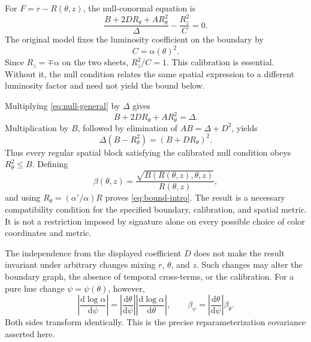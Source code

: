\documentclass[9pt,twocolumn,twoside]{opticajnl}
\theoremstyle{plain}
\newcommand{\dd}{\mathrm{d}}
\begin{document}
For $F=r-R(\theta,z)$, the null-conormal equation is
\begin{equation}
 \frac{B+2DR_\theta+AR_\theta^2}{\Delta}-\frac{R_z^2}{C}=0.
 \label{eq:null-general}
\end{equation}
The original model fixes the luminosity coefficient on the boundary by
\begin{equation}
 C=\alpha(\theta)^2.
 \label{eq:calibration}
\end{equation}
Since $R_z=\mp\alpha$ on the two sheets, $R_z^2/C=1$. This calibration is essential. Without it, the null condition relates the same spatial expression to a different luminosity factor and need not yield the bound below.

Multiplying \eqref{eq:null-general} by $\Delta$ gives
\begin{equation}
 B+2DR_\theta+AR_\theta^2=\Delta.
 \label{eq:null-calibrated}
\end{equation}
Multiplication by $B$, followed by elimination of $AB=\Delta+D^2$, yields
\begin{equation}
 \boxed{\Delta(B-R_\theta^2)=(B+DR_\theta)^2.}
 \label{eq:square}
\end{equation}
Thus every regular spatial block satisfying the calibrated null condition obeys $R_\theta^2\leq B$. Defining
\begin{equation}
 \beta(\theta,z)=\frac{\sqrt{B(R(\theta,z),\theta,z)}}{R(\theta,z)},
 \label{eq:beta}
\end{equation}
and using $R_\theta=(\alpha'/\alpha)R$ proves \eqref{eq:bound-intro}. The result is a necessary compatibility condition for the specified boundary, calibration, and spatial metric. It is not a restriction imposed by signature alone on every possible choice of color coordinates and metric.

The independence from the displayed coefficient $D$ does not make the result invariant under arbitrary changes mixing $r$, $\theta$, and $z$. Such changes may alter the boundary graph, the absence of temporal cross-terms, or the calibration. For a pure hue change $\psi=\psi(\theta)$, however,
\begin{equation}
 \left|\frac{\dd\log\alpha}{\dd\psi}\right|
 =\left|\frac{\dd\theta}{\dd\psi}\right|
  \left|\frac{\dd\log\alpha}{\dd\theta}\right|,
 \qquad \beta_\psi=\left|\frac{\dd\theta}{\dd\psi}\right|\beta_\theta.
 \label{eq:covariance}
\end{equation}
Both sides transform identically. This is the precise reparameterization covariance asserted here.
\end{document}
